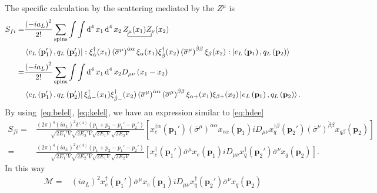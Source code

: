 The specific calculation by the scattering mediated by the $Z^{\mu}$ is 
\begin{align}
  S_{fi}=&\frac{\left( -ia_L \right)^{2}}{2!}\sum_{\text{spins}}\int\int \operatorname{d}^4x_1 \operatorname{d}^4x_2
\bcontraction{\,}{Z_{\mu}}{(x_1)}{Z_{\nu}}\,Z_{\mu}(x_1)Z_{\nu}(x_2) \nonumber\\
&\left\langle e_L\left(\mathbf{p}'_1\right), q_L \left(\mathbf{p}'_2\right) \right|
  : \xi^{\dagger}_{\dot{\alpha}}(x_1)\left( \overline{\sigma}^{\mu} \right)^{\dot{\alpha}\alpha}\xi_{\alpha}(x_1)\xi^{\dagger}_{\dot{\beta}}(x_2)\left( \overline{\sigma}^{\mu} \right)^{\dot{\beta}\beta}\xi_{\beta}(x_2):
 \left| e_L \left(\mathbf{p}_1\right), q_L\left(\mathbf{p}_2\right) \right\rangle \nonumber\\
=&\frac{\left( -ia_L \right)^{2}}{2!}\sum_{\text{spins}}\int\int \operatorname{d}^4x_1 \operatorname{d}^4x_2
D_{\mu\nu} \left( x_1-x_2 \right)\nonumber\\
&\left\langle e_L\left(\mathbf{p}'_1\right), q_L \left(\mathbf{p}'_2\right) \right|
   \xi^{\dagger}_{\dot{\alpha} -}(x_1)\xi^{\dagger}_{\dot{\beta}-}(x_2)\left( \overline{\sigma}^{\mu} \right)^{\dot{\alpha}\alpha}\left( \overline{\sigma}^{\mu} \right)^{\dot{\beta}\beta}\xi_{\alpha +}(x_1)\xi_{\beta +}(x_2)
 \left| e_L \left(\mathbf{p}_1\right), q_L\left(\mathbf{p}_2\right) \right\rangle. 
\end{align}
By using~\eqref{eq:belel}, \eqref{eq:kelel}, we have an expression similar to \eqref{eq:hdee}
\begin{align}
      S_{fi}
    =&\frac{(2\pi)^4(ia_L)^2\delta^{(4)}\left(p_1+p_2-p_1'-p_2'\right) }{\sqrt{2 E_1'V}\sqrt{2 E_2'V}\sqrt{2 E_1V}\sqrt{2 E_2V}}
 \left[ x^{\dagger\dot{\alpha}}_e(\mathbf{p}_1')\left( \overline{\sigma}^{\mu} \right)^{\dot{\alpha}\alpha}x_{e \alpha}(\mathbf{p}_1)  i D_{\mu\nu}x^{\dagger\dot{\beta}}_q(\mathbf{p}_2') \left( \overline{\sigma}^{\nu} \right)^{\dot{\beta}\beta}x_{q \beta}(\mathbf{p}_2)\right] \nonumber\\
=&\frac{(2\pi)^4(ia_L)^2\delta^{(4)}\left(p_1+p_2-p_1'-p_2'\right) }{\sqrt{2 E_1'V}\sqrt{2 E_2'V}\sqrt{2 E_1V}\sqrt{2 E_2V}}
  \left[ x_e^{\dagger}(\mathbf{p}_1') \overline{\sigma}^{\mu}x_e(\mathbf{p}_1)  i D_{\mu\nu}x_q^{\dagger}(\mathbf{p}_2') \overline{\sigma}^{\nu} x_q(\mathbf{p}_2)\right].
\end{align}
In this way
\begin{align}
  \mathcal{M}=&(ia_L)^2 x_e^{\dagger}(\mathbf{p}_1') \overline{\sigma}^{\mu}x_e(\mathbf{p}_1)  i D_{\mu\nu}x_q^{\dagger}(\mathbf{p}_2') \overline{\sigma}^{\nu} x_q(\mathbf{p}_2)
\end{align}
